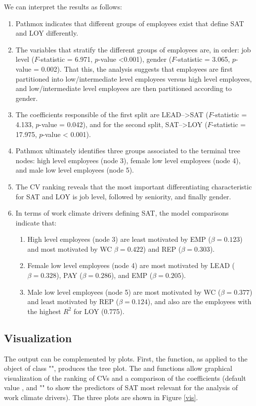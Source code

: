 We can interpret the  results as follows:

\begin{enumerate}
\item Pathmox indicates that different groups of employees exist that define SAT and LOY differently.
\item The variables that stratify the different groups of employees are, in order: job level ($F$-statistic = 6.971, $p$-value <0.001), gender ($F$-statistic = 3.065, $p$-value = 0.002). That this, the analysis suggests that employees are  first partitioned into low/intermediate level employees versus high level employees, and low/intermediate level employees are then partitioned according to  gender. 
\item The coefficients responsible of the first split  are  LEAD-->SAT   ($F$-statistic = 4.133, $p$-value = 0.042),  and for the second split, SAT-->LOY  ($F$-statistic = 17.975, $p$-value < 0.001).
\item Pathmox ultimately identifies three groups associated to the terminal tree nodes:  high level employees (node 3), female low level employees (node 4), and male low level employees (node 5).
\item The CV ranking reveals that the most important differentiating characteristic for SAT and LOY is job level, followed by seniority, and finally gender.
\item  In terms of work climate drivers defining SAT, the model comparisons indicate that: 
\begin{enumerate}
\item  High level employees (node 3) are least motivated by EMP ($\beta = 0.123$) and most motivated by WC $\beta = 0.422$) and REP ($\beta = 0.303$). 
\item Female low level employees (node 4) are most motivated by LEAD ($\beta = 0.328$), PAY ($\beta = 0.286$), and EMP ($\beta = 0.205$). 
\item  Male low level employees (node 5) are most motivated by WC ($\beta = 0.377$) and least motivated by REP ($\beta = 0.124$), and also are the employees with the highest $R^2$ for  LOY (0.775).
\end{enumerate}
\end{enumerate}


\subsection{Visualization}

The   output can be complemented by plots. First,  the   function, as applied to the object of class "", produces the tree plot. The  and   functions allow graphical visualization of the ranking of CVs and a  comparison of the coefficients (default value  , and    "" to show the predictors of SAT most relevant for the analysis of work climate drivers). The three plots are shown in Figure \ref{vis}. 

